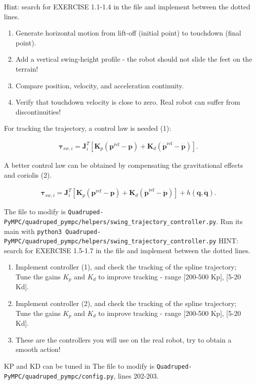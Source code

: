 \documentclass[11pt,a4paper]{article}
\begin{document}
Hint: search for EXERCISE 1.1-1.4 in the file and implement between the dotted lines.

\begin{enumerate}[label=\arabic*.]
    \item Generate horizontal motion from lift-off (initial point) to touchdown (final point).
    \item Add a vertical swing-height profile - the robot should not slide the feet on the terrain!
    \item Compare position, velocity, and acceleration continuity.
    \item Verify that touchdown velocity is close to zero. Real robot can suffer from discontinuities!
\end{enumerate}



For tracking the trajectory, a control law is needed (1):

\begin{align*}
\bm{\tau}_{sw,i}  =
\bm{J}_i^T \left[ \bm{K}_p
\left(
\bm{p}^{\mathrm{ref}}-\bm{p}
\right)
+
\bm{K}_d
\left(
\dot{\bm{p}}^{\mathrm{ref}}-\dot{\bm{p}}
\right)\right].
\end{align*}
 

A better control law can be obtained by compensating the gravitational effects and coriolis (2).  

\begin{align*}
\bm{\tau}_{sw,i}  =
\bm{J}_i^T \left[ \bm{K}_p
\left(
\bm{p}^{\mathrm{ref}}-\bm{p}
\right)
+
\bm{K}_d
\left(
\dot{\bm{p}}^{\mathrm{ref}}-\dot{\bm{p}}
\right)\right] + h(\bm{q}, \dot{\bm{q}}).
\end{align*}


The file to modify is \verb|Quadruped-PyMPC/quadruped_pympc/helpers/swing_trajectory_controller.py|.
Run its main with \verb|python3 Quadruped-PyMPC/quadruped_pympc/helpers/swing_trajectory_controller.py| 
HINT: search for EXERCISE 1.5-1.7 in the file and implement between the dotted lines.
\begin{enumerate}[label=\arabic*.]
    \item Implement controller (1), and check the tracking of the spline trajectory; Tune the gains \(K_p\) and \(K_d\) to improve tracking - range [200-500 Kp], [5-20 Kd].
    \item Implement controller (2), and check the tracking of the spline trajectory; Tune the gains \(K_p\) and \(K_d\) to improve tracking - range [200-500 Kp], [5-20 Kd].
    \item These are the controllers you will use on the real robot, try to obtain a smooth action!
\end{enumerate}
KP and KD can be tuned in The file to modify is \verb|Quadruped-PyMPC/quadruped_pympc/config.py|, lines 202-203.
\end{document}
